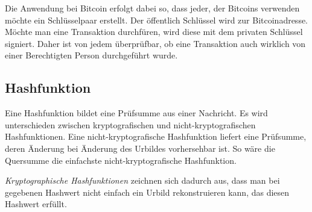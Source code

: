 Die Anwendung bei Bitcoin erfolgt dabei so, dass jeder, der Bitcoins verwenden möchte ein Schlüsselpaar erstellt.
Der öffentlich Schlüssel wird zur Bitcoinadresse.
Möchte man eine Transaktion durchfüren, wird diese mit dem privaten Schlüssel signiert.
Daher ist von jedem überprüfbar, ob eine Transaktion auch wirklich von einer Berechtigten Person durchgeführt wurde.

\subsection{Hashfunktion}

Eine Hashfunktion bildet eine Prüfsumme aus einer Nachricht. 
Es wird unterschieden zwischen kryptografischen und nicht-kryptografischen Hashfunktionen.
Eine nicht-kryptografische Hashfunktion liefert eine Prüfsumme, deren Änderung bei Änderung des Urbildes vorhersehbar ist.
So wäre die Quersumme die einfachste nicht-kryptografische Hashfunktion.

\emph{Kryptographische Hashfunktionen} zeichnen sich dadurch aus, dass man bei gegebenen Hashwert nicht einfach ein Urbild rekonstruieren kann, das diesen Hashwert erfüllt.
